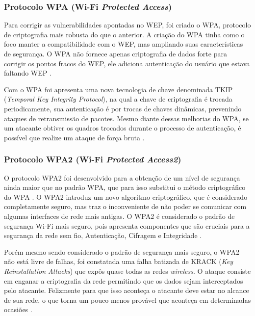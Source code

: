 \documentclass[
	article,			%
	11pt,				%
	oneside,			%
	a4paper,			%
	english,			%
	brazil,				%
	sumario=tradicional
	]{abntex2}
\begin{document}
\subsubsection{Protocolo WPA (Wi-Fi \textit{Protected Access})}
Para corrigir as vulnerabilidades apontadas no WEP, foi criado o WPA, protocolo de criptografia mais robusta do que o anterior. A criação do WPA tinha como o foco manter a compatibilidade com o WEP, mas ampliando suas características de segurança. O WPA não fornece apenas criptografia de dados forte para corrigir os pontos fracos do WEP, ele adiciona autenticação do usuário que estava faltando WEP \cite{alliance2003wi}.

Com o WPA foi apresenta uma nova tecnologia de chave denominada TKIP (\textit{Temporal Key Integrity Protocol}), na qual a chave de criptografia é trocada periodicamente, sua autenticação é por trocas de chaves dinâmicas, prevenindo ataques de retransmissão de pacotes. Mesmo diante dessas melhorias do WPA, se um atacante obtiver os quadros trocados durante o processo de autenticação, é possível que realize um ataque de força bruta \cite{fleishman2003weakness}. 
 
 
\subsubsection{Protocolo WPA2 (Wi-Fi \textit{Protected Access2})}
O protocolo WPA2 foi desenvolvido para a obtenção de um nível de segurança ainda maior que no padrão WPA, que para isso substitui o método criptográfico do WPA \cite{stangarlin2017analise}. O WPA2 introduz um novo algoritmo criptográfico, que é considerado completamente seguro, mas traz o inconveniente de não poder se comunicar com algumas interfaces de rede mais antigas. O WPA2 é considerado o padrão de segurança Wi-Fi mais seguro, pois apresenta componentes que são cruciais para a segurança da rede
sem fio, Autenticação, Cifragem e Integridade \cite{kumar2014literature}. 

Porém mesmo sendo considerado o padrão de segurança mais seguro, o WPA2 não está livre de falhas, foi constatada uma falha batizada de KRACK (\textit{Key Reinstallation Attacks}) que expôs quase todas as redes \textit{wireless}. O ataque consiste em enganar a criptografia da rede permitindo que os dados sejam interceptados pelo atacante. Felizmente para que isso aconteça o atacante deve estar no alcance de sua rede, o que torna um pouco menos provável que aconteça em determinadas ocasiões \cite{vanhoef2017key}. 
\end{document}
